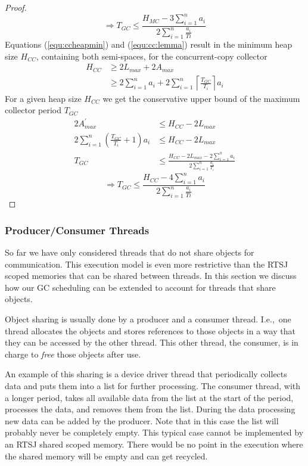 \begin{proof}
\begin{equation}
    \Rightarrow T_{GC} \le \frac{H_{MC}-3\sum_{i=1}^{n} a_i}{2\sum_{i=1}^{n} \frac{a_i}{Ti}}
\end{equation}
%
Equations (\ref{equ:ccheapmin}) and (\ref{equ:cc:lemma}) result in
the minimum heap size $H_{CC}$, containing both semi-spaces, for the
concurrent-copy collector
\begin{align} \nonumber
    H_{CC} & \ge 2 L_{max} + 2 A_{max}\\
           & \ge 2\sum_{i=1}^{n} a_i + 2\sum_{i=1}^{n}
              \left\lceil\frac{T_{GC}}{T_i}\right\rceil a_i
\end{align}
%
For a given heap size $H_{CC}$ we get the conservative upper bound
of the maximum collector period $T_{GC}$
\begin{align}
\nonumber
        2 A^{'}_{max} & \le H_{CC} - 2L_{max}
\\
        2\sum_{i=1}^{n} \left(\frac{T_{GC}}{T_i}+1\right) a_i
        & \le H_{CC} - 2L_{max}
\\
        T_{GC}
        & \le \frac{H_{CC} - 2L_{max} - 2\sum_{i=1}^{n} a_i}
        {2\sum_{i=1}^{n} \frac{a_i}{T_i}}
\end{align}
%
\begin{equation}
    \Rightarrow T_{GC} \le \frac{H_{CC}-4\sum_{i=1}^{n} a_i}{2\sum_{i=1}^{n} \frac{a_i}{Ti}}
\end{equation}
\end{proof}

\subsubsection{Producer/Consumer Threads} \label{sec:prod:cons}

So far we have only considered threads that do not share objects for
communication. This execution model is even more restrictive than
the RTSJ scoped memories that can be shared between threads. In this
section we discuss how our GC scheduling can be extended to account
for threads that share objects.

Object sharing is usually done by a producer and a consumer thread.
I.e.,\ one thread allocates the objects and stores references to
those objects in a way that they can be accessed by the other
thread. This other thread, the consumer, is in charge to \emph{free}
those objects after use.

An example of this sharing is a device driver thread that
periodically collects data and puts them into a list for further
processing. The consumer thread, with a longer period, takes all
available data from the list at the start of the period, processes
the data, and removes them from the list. During the data processing
new data can be added by the producer. Note that in this case the
list will probably never be completely empty. This typical case
cannot be implemented by an RTSJ shared scoped memory. There would
be no point in the execution where the shared memory will be empty
and can get recycled.

